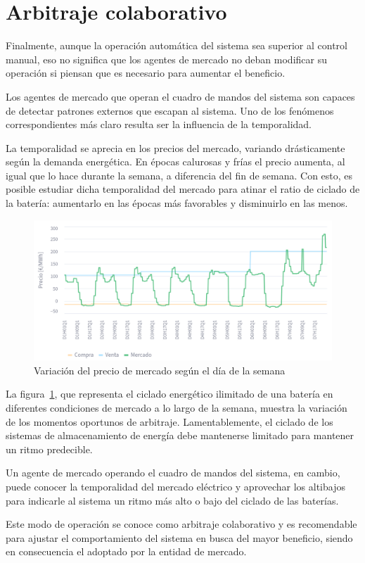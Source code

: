 \section{Arbitraje colaborativo}
\label{makereference7.5}

Finalmente, aunque la operación automática del sistema sea superior al control manual, eso no significa que los agentes de mercado no deban modificar su operación si piensan que es necesario para aumentar el beneficio.

Los agentes de mercado que operan el cuadro de mandos del sistema son capaces de detectar patrones externos que escapan al sistema. Uno de los fenómenos correspondientes más claro resulta ser la influencia de la temporalidad.

La temporalidad se aprecia en los precios del mercado, variando drásticamente según la demanda energética. En épocas calurosas y frías el precio aumenta, al igual que lo hace durante la semana, a diferencia del fin de semana. Con esto, es posible estudiar dicha temporalidad del mercado para atinar el ratio de ciclado de la batería: aumentarlo en las épocas más favorables y disminuirlo en las menos.

\begin{figure}
  \centering
  \includegraphics[width=0.5\linewidth]{figures/temporalidad-mercado.png}
  \caption{Variación del precio de mercado según el día de la semana}
  \label{fig:temporalidad-mercado}
\end{figure}

La figura~\ref{fig:temporalidad-mercado}, que representa el ciclado energético ilimitado de una batería en diferentes condiciones de mercado a lo largo de la semana, muestra la variación de los momentos oportunos de arbitraje. Lamentablemente, el ciclado de los sistemas de almacenamiento de energía debe mantenerse limitado para mantener un ritmo predecible.

Un agente de mercado operando el cuadro de mandos del sistema, en cambio, puede conocer la temporalidad del mercado eléctrico y aprovechar los altibajos para indicarle al sistema un ritmo más alto o bajo del ciclado de las baterías.

Este modo de operación se conoce como arbitraje colaborativo y es recomendable para ajustar el comportamiento del sistema en busca del mayor beneficio, siendo en consecuencia el adoptado por la entidad de mercado.
